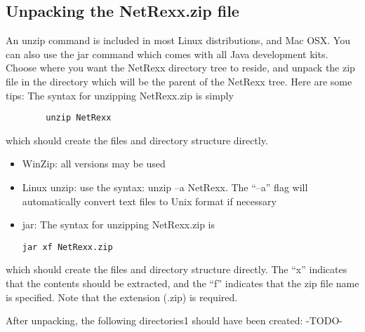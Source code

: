 \subsection{Unpacking the NetRexx.zip file} 
An unzip command is included in most Linux distributions, and Mac OSX. You can also use the jar command which comes with all Java development kits. 
Choose where you want the NetRexx directory tree to reside, and unpack the zip file in the directory which will be the parent of the NetRexx tree. Here are some tips: 
The syntax for unzipping NetRexx.zip is simply
\begin{verbatim}
        unzip NetRexx
\end{verbatim}
which should create the files and directory structure directly.
\begin{itemize} 
\item WinZip: all versions may be used
\item Linux unzip: use the syntax: unzip –a NetRexx. The “–a” flag will automatically convert text files to Unix format if necessary
\item jar: The syntax for unzipping NetRexx.zip is
\begin{verbatim} 
jar xf NetRexx.zip 
\end{verbatim}
\end{itemize}
which should create the files and directory structure directly. The “x” indicates that the contents should be extracted, and the “f” indicates that the zip file name is specified. Note that the extension (.zip) is required. 

After unpacking, the following directories1 should have been created:
-TODO-
